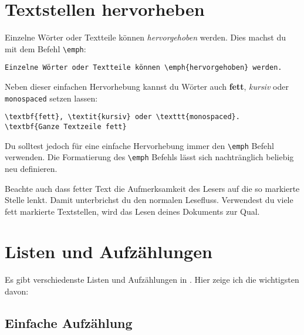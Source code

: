 \section{Textstellen hervorheben}

Einzelne Wörter oder Textteile können \emph{hervorgehoben} werden. Dies machst du mit dem Befehl \texttt{\textbackslash emph}:

\begin{lstlisting}
Einzelne Wörter oder Textteile können \emph{hervorgehoben} werden.
\end{lstlisting}

Neben dieser einfachen Her\-vor\-he\-bung kannst du Wörter auch \textbf{fett}, \textit{kursiv} oder\\ \texttt{monospaced} setzen lassen:

\begin{lstlisting}
\textbf{fett}, \textit{kursiv} oder \texttt{monospaced}.
\textbf{Ganze Textzeile fett}
\end{lstlisting}

Du solltest jedoch für eine einfache Hervorhebung immer den \texttt{\textbackslash emph} Befehl verwenden. Die Formatierung des \texttt{\textbackslash emph} Befehls lässt sich nachtränglich beliebig neu definieren.

Beachte auch dass fetter Text die Aufmerksamkeit des Lesers auf die so markierte Stelle lenkt. Damit unterbrichst du den normalen Lesefluss. Verwendest du viele fett markierte Textstellen, wird das Lesen deines Dokuments zur Qual.

\section{Listen und Aufzählungen}

Es gibt verschiedenste Listen und Aufzählungen in \DMLLaTeX. Hier zeige ich die wichtigsten davon:

\subsection{Einfache Aufzählung}

